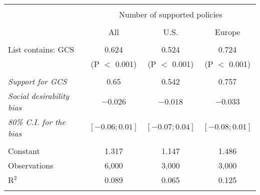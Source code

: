 
\begin{tabular}{@{\extracolsep{5pt}}lccc} 
\\[-1.8ex]\hline 
\hline \\[-1.8ex] 
 & \multicolumn{3}{c}{Number of supported policies} \\ 
\cline{2-4} 
\\[-1.8ex] & All & U.S. & Europe \\ 
\hline \\[-1.8ex] 
 List contains: GCS & 0.624 & 0.524 & 0.724 \\ 
  & (P $<$ 0.001) & (P $<$ 0.001) & (P $<$ 0.001) \\ 
\hline  \\[-1.8ex] \textit{Support for GCS} & 0.65  &  0.542  &  0.757 \\
\textit{Social desirability bias} & \textit{$ -0.026 $} & \textit{$ -0.018 $} & \textit{$ -0.033 $}\\
\textit{80\% C.I. for the bias} & \textit{ $[ -0.06 ; 0.01 ]$ } & \textit{ $[ -0.07 ; 0.04 ]$} & \textit{ $[ -0.08 ; 0.01 ]$}\\
 \hline \\[-1.8ex] 
Constant & 1.317 & 1.147 & 1.486 \\ 
Observations & 6,000 & 3,000 & 3,000 \\ 
R$^{2}$ & 0.089 & 0.065 & 0.125 \\ 
\hline 
\hline \\[-1.8ex] 
\end{tabular} 